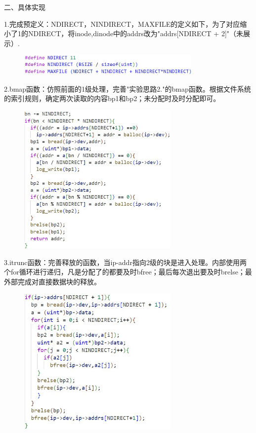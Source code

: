 \documentclass[12pt]{article}
\begin{document}
\noindent 二、具体实现\par
1.完成预定义：NDIRECT，NINDIRECT，MAXFILE的定义如下，为了对应缩小了1的NDIRECT，将inode,dinode中的addrs改为"addrs[NDIRECT + 2]"（未展示）.
\begin{figure}[H]
    \centering
    \includegraphics[width=0.8\textwidth]{lab6-1.jpg}
\end{figure}\par
2.bmap函数：仿照前面的1级处理，完善"实验思路2."的bmap函数。根据文件系统的索引规则，确定两次读取的内容bp1和bp2；未分配时及时分配即可。
\newpage
\begin{figure}[H]
    \centering
    \includegraphics[width=0.7\textwidth]{lab6-2.jpg}
\end{figure}\par
3.itrunc函数：完善释放的函数，当ip-addr指向2级的块是进入处理。内部使用两个for循环进行递归，凡是分配了的都要及时bfree；最后每次退出要及时brelse；最外部完成对直接数据块的释放。
\begin{figure}[H]
    \centering
    \includegraphics[width=0.7\textwidth]{lab6-3.jpg}
\end{figure}\par
\end{document}
